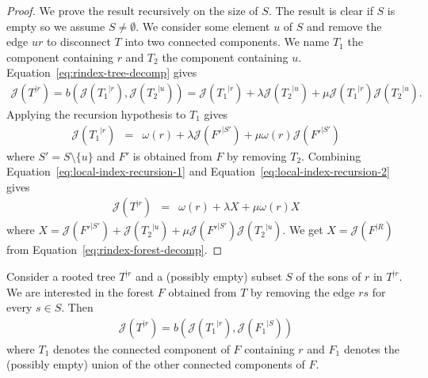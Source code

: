 \documentclass[11 pt]{modarticle}
\newcommand{\wmap}{\omega}
\newcommand{\rtree}[2]{{#1}^{\lvert #2}}
\newcommand{\bilinear}{b}
\newcommand{\rindexsymbol}{\mathcal{J}}
\newcommand{\rindex}[2]{\rindexsymbol(\rtree{#2}{#1})}
\begin{document}
\begin{proof}
We prove the result recursively on the size of $S$. The result is clear if $S$ is empty so we assume $S \neq \emptyset$. We consider some element $u$ of $S$ and remove the edge $ur$ to disconnect $T$ into two connected components. We name $T_1$ the component containing $r$ and $T_2$ the component containing $u$. Equation~\eqref{eq:rindex-tree-decomp} gives
\begin{eqnarray}
	\rindex{r}{T} = \bilinear(\rindex{r}{T_1}, \rindex{u}{T_2}) = \rindex{r}{T_1} + \lambda \rindex{u}{T_2} + \mu \rindex{r}{T_1} \rindex{u}{T_2}. \label{eq:local-index-recursion-1}
\end{eqnarray}
Applying the recursion hypothesis to $T_1$ gives
\begin{eqnarray}
	\rindex{r}{T_1} & = & \wmap(r) + \lambda \rindex{S'}{F'} + \mu \wmap(r) \rindex{S'}{F'} \label{eq:local-index-recursion-2}
\end{eqnarray}
where $S' = S \setminus \{u\}$ and $F'$ is obtained from $F$ by removing $T_2$.	Combining Equation~\eqref{eq:local-index-recursion-1} and Equation~\eqref{eq:local-index-recursion-2} gives
\begin{eqnarray*}
	\rindex{r}{T} & = & \wmap(r) + \lambda X + \mu \wmap(r) X
\end{eqnarray*}
where $X = \rindex{S'}{F'} + \rindex{u}{T_2} + \mu \rindex{S'}{F'} \rindex{u}{T_2}$. We get $X = \rindex{R}{F}$ from Equation~\eqref{eq:rindex-forest-decomp}.
\end{proof}

\begin{cor}\label{cor:local-index-recursion}
	Consider a rooted tree $\rtree{T}{r}$ and a (possibly empty) subset $S$ of the sons of $r$ in $\rtree{T}{r}$. We are interested in the forest $F$ obtained from $T$ by removing the edge $rs$ for every $s \in S$. Then
\begin{eqnarray*}
	\rindex{r}{T} = \bilinear(\rindex{r}{T_1}, \rindex{S}{F_1})
\end{eqnarray*}
where $T_1$ denotes the connected component of $F$ containing $r$ and $F_1$ denotes the (possibly empty) union of the other connected components of $F$.
\end{cor}
\end{document}
